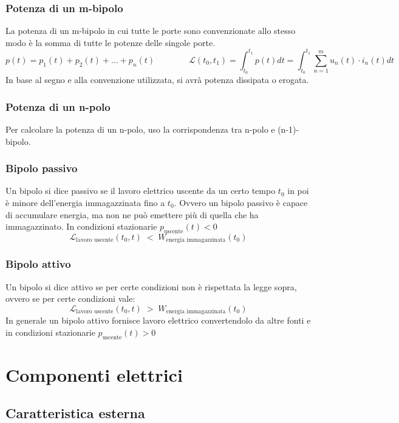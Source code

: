 \documentclass[a4paper]{article}
\begin{document}
\newpage

\subsubsection*{Potenza di un m-bipolo}
La potenza di un m-bipolo in cui tutte le porte sono convenzionate allo stesso modo è la somma di tutte le potenze delle singole porte.
\[p(t) = p_1(t) + p_2(t) + \dots + p_n(t) \qquad \qquad \mathcal{L}(t_0, t_1) = \int_{t_0}^{t_1} p(t) dt = \int_{t_0}^{t_1} \sum_{n=1}^{m} u_n(t) \cdot i_n(t) dt\]
In base al segno e alla convenzione utilizzata, si avrà potenza dissipata o erogata.

\subsubsection*{Potenza di un n-polo}
Per calcolare la potenza di un n-polo, uso la corrispondenza tra n-polo e (n-1)-bipolo.

\subsubsection*{Bipolo passivo}
Un bipolo si dice passivo se il lavoro elettrico uscente da un certo tempo \(t_0\) in poi è minore dell'energia immagazzinata
fino a \(t_0\). Ovvero un bipolo passivo è capace di accumulare energia, ma non ne può emettere più di quella che ha immagazzinato.
In condizioni stazionarie \(p_\text{uscente}(t) < 0\)
\[\mathcal{L}_\text{lavoro uscente}(t_0,t) \; < \; W_\text{energia immagazzinata}(t_0)\]

\subsubsection*{Bipolo attivo}
Un bipolo si dice attivo se per certe condizioni non è rispettata la legge sopra, ovvero se per certe condizioni vale:
\[\mathcal{L}_\text{lavoro uscente}(t_0,t) \; > \; W_\text{energia immagazzinata}(t_0)\]
In generale un bipolo attivo fornisce lavoro elettrico convertendolo da altre fonti e in condizioni stazionarie \(p_\text{uscente}(t) > 0\)

\newpage

\section{Componenti elettrici}
\subsection{Caratteristica esterna}
\end{document}
